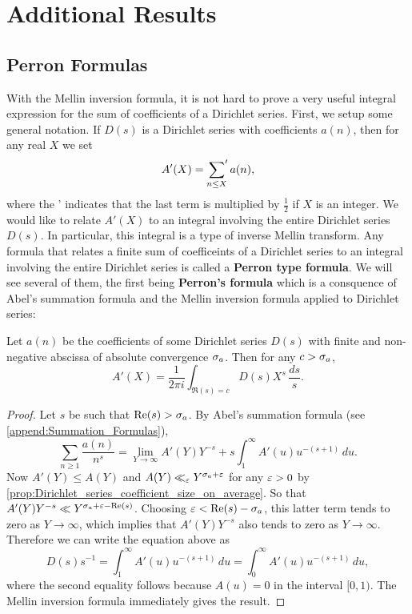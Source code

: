   \chapter{Additional Results}
    \section{Perron Formulas}
      With the Mellin inversion formula, it is not hard to prove a very useful integral expression for the sum of coefficients of a Dirichlet series. First, we setup some general notation. If $D(s)$ is a Dirichlet series with coefficients $a(n)$, then for any real $X$ we set
      \[
        A'(X) = \sideset{}{'}\sum_{n \le X}a(n),
      \]
      where the ' indicates that the last term is multiplied by $\frac{1}{2}$ if $X$ is an integer. We would like to relate $A'(X)$ to an integral involving the entire Dirichlet series $D(s)$. In particular, this integral is a type of inverse Mellin transform. Any formula that relates a finite sum of coefficeints of a Dirichlet series to an integral involving the entire Dirichlet series is called a \textbf{Perron type formula}. We will see several of them, the first being \textbf{Perron's formula} which is a consquence of Abel's summation formula and the Mellin inversion formula applied to Dirichlet series:

      \begin{theorem}
        Let $a(n)$ be the coefficients of some Dirichlet series $D(s)$ with finite and non-negative abscissa of absolute convergence $\sigma_{a}$. Then for any $c > \sigma_{a}$,
        \[
          A'(X) = \frac{1}{2\pi i}\int_{\Re(s) = c}D(s)X^{s}\,\frac{ds}{s}.
        \]
      \end{theorem}
      \begin{proof}
        Let $s$ be such that $\mathrm{Re}(s) > \sigma_{a}$. By Abel's summation formula (see \cref{append:Summation_Formulas}),
        \[
          \sum_{n \ge 1}\frac{a(n)}{n^{s}} = \lim_{Y \to \infty}A'(Y)Y^{-s}+s\int_{1}^{\infty}A'(u)u^{-(s+1)}\,du.
        \]
        Now $A'(Y) \le A(Y)$ and $A(Y) \ll_{\varepsilon} Y^{\sigma_{a}+\varepsilon}$ for any $\varepsilon > 0$ by \cref{prop:Dirichlet_series_coefficient_size_on_average}. So that $A'(Y)Y^{-s} \ll Y^{\sigma_{a}+\varepsilon-\mathrm{Re}(s)}$. Choosing $\varepsilon < \mathrm{Re}(s)-\sigma_{a}$, this latter term tends to zero as $Y \to \infty$, which implies that $A'(Y)Y^{-s}$ also tends to zero as $Y \to \infty$. Therefore we can write the equation above as
        \[
          D(s)s^{-1} = \int_{1}^{\infty}A'(u)u^{-(s+1)}\,du = \int_{0}^{\infty}A'(u)u^{-(s+1)}\,du,
        \]
        where the second equality follows because $A(u) = 0$ in the interval $[0,1)$. The Mellin inversion formula immediately gives the result.
      \end{proof}


